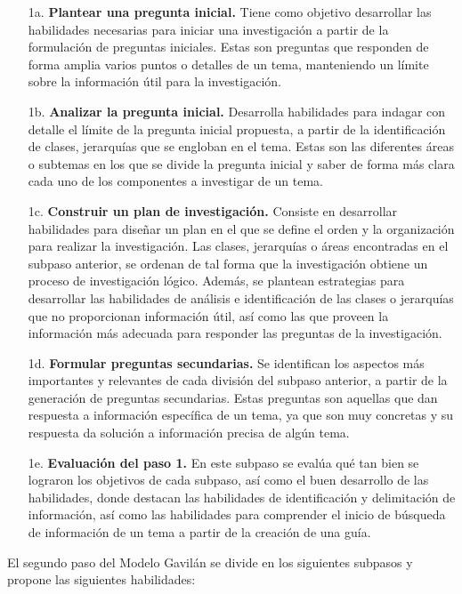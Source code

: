 \begin{itemize}
  \item [1a.] \textbf{Plantear una pregunta inicial.} Tiene como objetivo desarrollar las habilidades necesarias para iniciar una investigación a partir de la formulación de preguntas iniciales. Estas son preguntas que responden de forma amplia varios puntos o detalles de un tema, manteniendo un límite sobre la información útil para la investigación.
  \item [1b.] \textbf{Analizar la pregunta inicial.} Desarrolla habilidades para indagar con detalle el límite de la pregunta inicial propuesta, a partir de la identificación de clases, jerarquías que se engloban en el tema. Estas son las diferentes áreas o subtemas en los que se divide la pregunta inicial y saber de forma más clara cada uno de los componentes a investigar de un tema.
  \item [1c.] \textbf{Construir un plan de investigación.} Consiste en desarrollar habilidades para diseñar un plan en el que se define el orden y la organización para realizar la investigación. Las clases, jerarquías o áreas encontradas en el subpaso anterior, se ordenan de tal forma que la investigación obtiene un proceso de investigación lógico. Además, se plantean estrategias para desarrollar las habilidades de análisis e identificación de las clases o jerarquías que no proporcionan información útil, así como las que proveen la información más adecuada para responder las preguntas de la investigación. 
  \item [1d.] \textbf{Formular preguntas secundarias.} Se identifican los aspectos más importantes y relevantes de cada división del subpaso anterior, a partir de la generación de preguntas secundarias. Estas preguntas son aquellas que dan respuesta a información específica de un tema, ya que son muy concretas y su respuesta da solución a información precisa de algún tema.
  \item [1e.] \textbf{Evaluación del paso 1.} En este subpaso se evalúa qué tan bien se lograron los objetivos de cada subpaso, así como el buen desarrollo de las habilidades, donde destacan las habilidades de identificación y delimitación de información, así como las habilidades para comprender el inicio de búsqueda de información de un tema a partir de la creación de una guía.
\end{itemize}

El segundo paso del Modelo Gavilán se divide en los siguientes subpasos y propone las siguientes habilidades:

